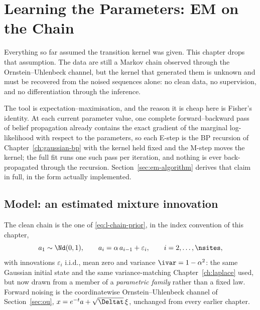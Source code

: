 \chapter{Learning the Parameters: EM on the Chain}\label{ch:em-method}

Everything so far assumed the transition kernel was given. This chapter drops
that assumption. The data are still a Markov chain observed through the
Ornstein--Uhlenbeck channel, but the kernel that generated them is unknown and
must be recovered from the noised sequences alone: no clean data, no
supervision, and no differentiation through the inference.

The tool is expectation--maximisation, and the reason it is cheap here is
Fisher's identity. At each current parameter value, one complete
forward--backward pass of belief propagation already contains the exact
gradient of the marginal log-likelihood with respect to the parameters, so
each E-step is the BP recursion of Chapter~\ref{ch:gaussian-bp} with the
kernel held fixed and the M-step moves the kernel; the full fit runs one such
pass per iteration, and nothing is ever back-propagated through the recursion.
Section~\ref{sec:em-algorithm} derives that claim in full, in the form
actually implemented.

\section{Model: an estimated mixture innovation}\label{sec:em-model}

The clean chain is the one of \eqref{eq:l-chain-prior}, in the index
convention of this chapter,
\begin{equation}
  a_1 \sim \Nd(0,1), \qquad a_i = \alpha\, a_{i-1} + \varepsilon_i,
  \qquad i = 2,\dots,\nsites,
  \label{eq:em-chain}
\end{equation}
with innovations $\varepsilon_i$ i.i.d., mean zero and variance
$\ivar = 1-\alpha^2$: the same Gaussian initial state and the same
variance-matching Chapter~\ref{ch:laplace} used, but now drawn from a member of
a \emph{parametric family} rather than a fixed law. Forward noising is the
coordinatewise Ornstein--Uhlenbeck channel of Section~\ref{sec:ou},
$x = e^{-t} a + \sqrt{\Deltat}\,\xi$, unchanged from every earlier chapter.

